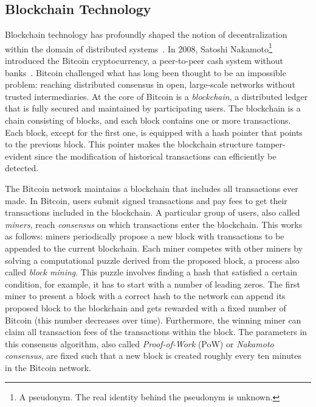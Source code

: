 \subsection{Blockchain Technology}
Blockchain technology has profoundly shaped the notion of decentralization within the domain of distributed systems~\cite{aste2017blockchain}.
In 2008, Satoshi Nakamoto\footnote{A pseudonym. The real identity behind the pseudonym is unknown.} introduced the Bitcoin cryptocurrency, a peer-to-peer cash system without banks~\cite{nakamoto2008bitcoin}.
Bitcoin challenged what has long been thought to be an impossible problem: reaching distributed consensus in open, large-scale networks without trusted intermediaries.
At the core of Bitcoin is a \emph{blockchain}, a distributed ledger that is fully secured and maintained by participating users.
The blockchain is a chain consisting of blocks, and each block contains one or more transactions.
Each block, except for the first one, is equipped with a hash pointer that points to the previous block.
This pointer makes the blockchain structure tamper-evident since the modification of historical transactions can efficiently be detected.

The Bitcoin network maintains a blockchain that includes all transactions ever made.
In Bitcoin, users submit signed transactions and pay fees to get their transactions included in the blockchain.
A particular group of users, also called \emph{miners}, reach \emph{consensus} on which transactions enter the blockchain.
This works as follows: miners periodically propose a new block with transactions to be appended to the current blockchain.
Each miner competes with other miners by solving a computational puzzle derived from the proposed block, a process also called \emph{block mining}.
This puzzle involves finding a hash that satisfied a certain condition, for example, it has to start with a number of leading zeros.
The first miner to present a block with a correct hash to the network can append its proposed block to the blockchain and gets rewarded with a fixed number of Bitcoin (this number decreases over time).
Furthermore, the winning miner can claim all transaction fees of the transactions within the block.
The parameters in this consensus algorithm, also called \emph{Proof-of-Work} (PoW) or \emph{Nakamoto consensus}, are fixed such that a new block is created roughly every ten minutes in the Bitcoin network.

